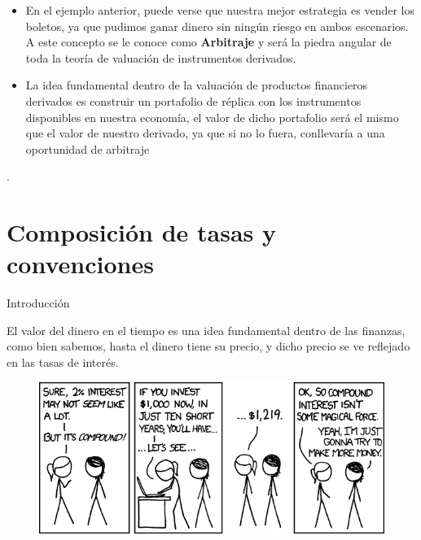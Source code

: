 \documentclass[11pt]{beamer}
\begin{document}
\begin{frame}{{}}
	\begin{itemize}
		\justifying
		\item En el ejemplo anterior, puede verse que nuestra mejor estrategia es vender los boletos, ya que pudimos ganar dinero sin ningún riesgo en ambos escenarios. A este concepto se le conoce como \textbf{Arbitraje} y será la piedra angular de toda la teoría de valuación de instrumentos derivados.
		
		\item La idea fundamental dentro de la valuación de productos financieros derivados es construir un portafolio de réplica con los instrumentos disponibles en nuestra economía, el valor de dicho portafolio será el mismo que el valor de nuestro derivado, ya que si no lo fuera, conllevaría a una oportunidad de arbitraje
		
	\end{itemize}
	
	
	. 
\end{frame}


\section{Composición de tasas y convenciones}

\begin{frame}{Introducción}
	
	El valor del dinero en el tiempo es una idea fundamental dentro de las finanzas, como bien sabemos, hasta el dinero tiene su precio, y dicho precio se ve reflejado en las tasas de interés.
	\begin{figure}
		\centering
		\includegraphics[width=0.7\linewidth]{investing}
		
		\label{fig:investing}
	\end{figure}
	
\end{frame}
\end{document}

